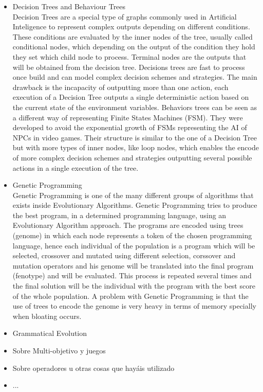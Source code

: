 \documentclass{llncs}
\begin{document}
\begin{itemize}
\item Decision Trees and Behaviour Trees
\\
Decision Trees are a special type of graphs commonly used in Artificial Inteligence to represent complex outputs depending on different conditions. These conditions are evaluated by the inner nodes of the tree, usually called conditional nodes, which depending on the output of the condition they hold they set which child node to process. Terminal nodes are the outputs that will be obtained from the decision tree. 
Decisions trees are fast to process once build and can model complex decision schemes and strategies. The main drawback is the incapacity of outputting more than one action, each execution of a Decision Tree outputs a single deterministic action based on the current state of the environment variables.
Behaviors trees can be seen as a different way of representing Finite States Machines (FSM). They were developed to avoid the exponential growth of FSMs representing the AI of NPCs in video games. Their structure is similar to the one of a Decision Tree but with more types of inner nodes, like loop nodes, which enables the encode of more complex decision schemes and strategies outputting several possible actions in a single execution of the tree.
\item Genetic Programming
\\
Genetic Programming is one of the many different groups of algorithms that exists inside Evolutionary Algorithms. Genetic Programming tries to produce the best program, in a determined programming language, using an Evolutionary Algorithm approach. The programs are encoded using trees (genome)  in which each node represents a token of the chosen programming language, hence each individual of the population is a program which will be selected, crossover and mutated using different selection, corssover and mutation operators and his genome will be translated into the final program (fenotype) and will be evaluated. This process is repeated several times and the final solution will be the individual with the program with the best score of the whole population. A problem with Genetic Programming is that the use of trees to encode the genome is very heavy in terms of memory specially when bloating occurs.  %
\item Grammatical Evolution
\\

\item Sobre Multi-objetivo y juegos 
\item Sobre operadores u otras cosas que hayáis utilizado
\item ...
\end{itemize}
\end{document}
